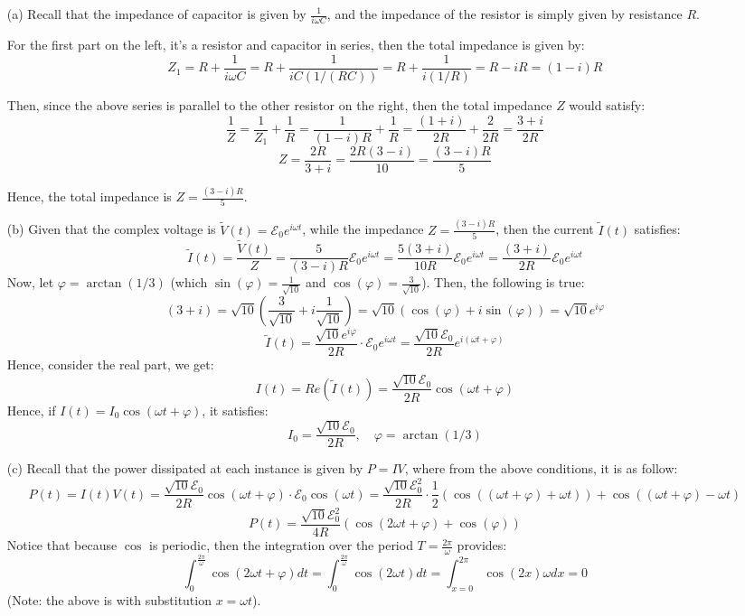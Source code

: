 \documentclass{article}
\begin{document}
\begin{itemize}
    \item[(a)] Recall that the impedance of capacitor is given by $\frac{1}{i\omega C}$, and the impedance of the resistor is simply given by resistance $R$.
    
    For the first part on the left, it's a resistor and capacitor in series, then the total impedance is given by:
    $$Z_1 = R+\frac{1}{i\omega C} = R+\frac{1}{iC(1/(RC))}=R+\frac{1}{i(1/R)}=R-iR = (1-i)R$$

    Then, since the above series is parallel to the other resistor on the right, then the total impedance $Z$ would satisfy:
    $$\frac{1}{Z}=\frac{1}{Z_1}+\frac{1}{R}=\frac{1}{(1-i)R}+\frac{1}{R} = \frac{(1+i)}{2R}+\frac{2}{2R}=\frac{3+i}{2R}$$
    $$Z=\frac{2R}{3+i}=\frac{2R(3-i)}{10}=\frac{(3-i)R}{5}$$

    Hence, the total impedance is $Z=\frac{(3-i)R}{5}$.
    
    \hfill

    \item[(b)] Given that the complex voltage is $\tilde{V}(t)=\mathcal{E}_0e^{i\omega t}$, while the impedance $Z=\frac{(3-i)R}{5}$, then the current $\tilde{I}(t)$ satisfies:
    $$\tilde{I}(t)=\frac{\tilde{V}(t)}{Z} = \frac{5}{(3-i)R}\mathcal{E}_0e^{i\omega t}=\frac{5(3+i)}{10R}\mathcal{E}_0e^{i\omega t}=\frac{(3+i)}{2R}\mathcal{E}_0e^{i\omega t}$$
    Now, let $\varphi = \arctan(1/3)$ (which $\sin(\varphi)=\frac{1}{\sqrt{10}}$ and $\cos(\varphi)=\frac{3}{\sqrt{10}}$). Then, the following is true:
    $$(3+i)=\sqrt{10}\left(\frac{3}{\sqrt{10}}+i\frac{1}{\sqrt{10}}\right)=\sqrt{10}(\cos(\varphi)+i\sin(\varphi))=\sqrt{10}e^{i\varphi}$$
    $$\tilde{I}(t)=\frac{\sqrt{10}e^{i\varphi}}{2R}\cdot \mathcal{E}_0e^{i\omega t}=\frac{\sqrt{10}\mathcal{E}_0}{2R}e^{i(\omega t+\varphi)}$$
    Hence, consider the real part, we get:
    $$I(t)=Re(\tilde{I}(t))=\frac{\sqrt{10}\mathcal{E}_0}{2R}\cos(\omega t+\varphi)$$
    Hence, if $I(t)=I_0\cos(\omega t+\varphi)$, it satisfies:
    $$I_0=\frac{\sqrt{10}\mathcal{E}_0}{2R},\quad \varphi=\arctan(1/3)$$
    
    \hfill

    \item[(c)] Recall that the power dissipated at each instance is given by $P=IV$, where from the above conditions, it is as follow:
    $$P(t)=I(t)V(t)=\frac{\sqrt{10}\mathcal{E}_0}{2R}\cos(\omega t+\varphi)\cdot \mathcal{E}_0\cos(\omega t)=\frac{\sqrt{10}\mathcal{E}_0^2}{2R}\cdot\frac{1}{2}(\cos((\omega t+\varphi)+\omega t))+\cos((\omega t+\varphi)-\omega t)$$
    $$P(t)=\frac{\sqrt{10}\mathcal{E}_0^2}{4R}(\cos(2\omega t+\varphi)+\cos(\varphi))$$
    Notice that because $\cos$ is periodic, then the integration over the period $T=\frac{2\pi}{\omega}$ provides:
    $$\int_{0}^{\frac{2\pi}{\omega}}\cos(2\omega t+\varphi)dt = \int_{0}^{\frac{2\pi}{\omega}}\cos(2\omega t)dt = \int_{x=0}^{2\pi}\cos(2x)\omega dx = 0$$
    (Note: the above is with substitution $x=\omega t$).


\end{itemize}
\end{document}
